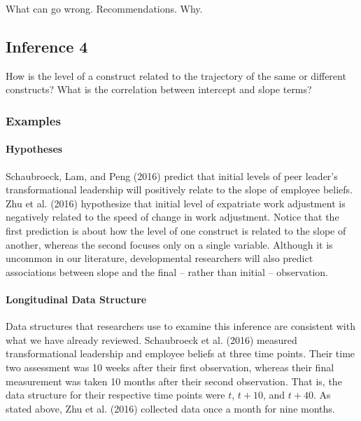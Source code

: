 \documentclass[english,,man]{apa6}
\let\oldparagraph\paragraph
\renewcommand{\paragraph}[1]{\oldparagraph{#1}\mbox{}}
\theoremstyle{definition}
\theoremstyle{definition}
\theoremstyle{definition}
\theoremstyle{remark}
\begin{document}
What can go wrong. Recommendations. Why.

\hypertarget{inference-4}{%
\subsection{Inference 4}\label{inference-4}}

How is the level of a construct related to the trajectory of the same or
different constructs? What is the correlation between intercept and
slope terms?

\hypertarget{examples-3}{%
\subsubsection{Examples}\label{examples-3}}

\hypertarget{hypotheses-4}{%
\paragraph{Hypotheses}\label{hypotheses-4}}

Schaubroeck, Lam, and Peng (2016) predict that initial levels of peer
leader's transformational leadership will positively relate to the slope
of employee beliefs. Zhu et al. (2016) hypothesize that initial level of
expatriate work adjustment is negatively related to the speed of change
in work adjustment. Notice that the first prediction is about how the
level of one construct is related to the slope of another, whereas the
second focuses only on a single variable. Although it is uncommon in our
literature, developmental researchers will also predict associations
between slope and the final -- rather than initial -- observation.

\hypertarget{longitudinal-data-structure-4}{%
\paragraph{Longitudinal Data
Structure}\label{longitudinal-data-structure-4}}

Data structures that researchers use to examine this inference are
consistent with what we have already reviewed. Schaubroeck et al. (2016)
measured transformational leadership and employee beliefs at three time
points. Their time two assessment was 10 weeks after their first
observation, whereas their final measurement was taken 10 months after
their second observation. That is, the data structure for their
respective time points were \(t\), \(t + 10\), and \(t + 40\). As stated
above, Zhu et al. (2016) collected data once a month for nine months.
\end{document}
